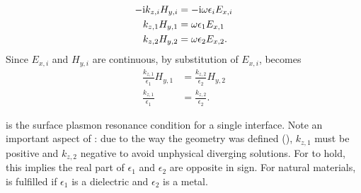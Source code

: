 \begin{align}
  -{\mathrm{i}} k_{z,i} H_{y,i} & = -{\mathrm{i}} \omega \epsilon_i E_{x,i} \\
  k_{z,1} H_{y,1}      & = \omega \epsilon_1 E_{x,1}      \\
  k_{z,2} H_{y,2}      & = \omega \epsilon_2 E_{x,2}.
  \label{eqn:spderivsteptwo}
\end{align}
Since $E_{x,i}$ and $H_{y,i}$ are continuous,
by substitution of $E_{x,i}$,  becomes
\begin{align}
  \frac{k_{z,1}}{\epsilon_1}H_{y,1} & =\frac{k_{z,2}}{\epsilon_2}H_{y,2} \\
  \frac{k_{z,1}}{\epsilon_1}        & =\frac{k_{z,2}}{\epsilon_2}.
  \label{eqn:sprcondition}
\end{align}

 is the surface plasmon resonance condition for
a single interface.  Note an important aspect of
:  due to the way the geometry was defined
(), $k_{z,1}$ must be positive and $k_{z,2}$
negative to avoid unphysical diverging solutions.  For
 to hold, this implies the real part of
$\epsilon_1$ and $\epsilon_2$ are opposite in sign.  For natural materials,
 is fulfilled if $\epsilon_1$ is a dielectric
and $\epsilon_2$ is a metal.
